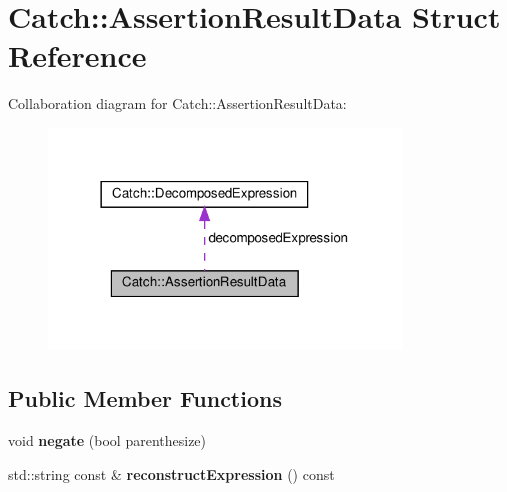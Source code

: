\hypertarget{structCatch_1_1AssertionResultData}{}\section{Catch\+:\+:Assertion\+Result\+Data Struct Reference}
\label{structCatch_1_1AssertionResultData}


Collaboration diagram for Catch\+:\+:Assertion\+Result\+Data\+:
\nopagebreak
\begin{figure}[H]
\begin{center}
\leavevmode
\includegraphics[width=266pt]{structCatch_1_1AssertionResultData__coll__graph}
\end{center}
\end{figure}
\subsection*{Public Member Functions}
\begin{DoxyCompactItemize}
\item 
\mbox{\label{structCatch_1_1AssertionResultData_a3b4df7cd1f8228ea1144b5cd0af6006a}} 
void {\bfseries negate} (bool parenthesize)
\item 
\mbox{\label{structCatch_1_1AssertionResultData_adbc0629083cd2e76c3a78696453443b0}} 
std\+::string const  \& {\bfseries reconstruct\+Expression} () const
\end{DoxyCompactItemize}

